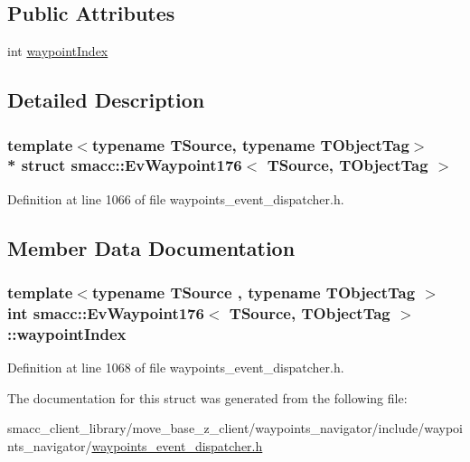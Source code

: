 \subsection*{Public Attributes}
\begin{DoxyCompactItemize}
\item 
int \hyperlink{structsmacc_1_1EvWaypoint176_aa2304f78eee05ed00c7d92f5c6ee546a}{waypoint\+Index}
\end{DoxyCompactItemize}


\subsection{Detailed Description}
\subsubsection*{template$<$typename T\+Source, typename T\+Object\+Tag$>$\\*
struct smacc\+::\+Ev\+Waypoint176$<$ T\+Source, T\+Object\+Tag $>$}



Definition at line 1066 of file waypoints\+\_\+event\+\_\+dispatcher.\+h.



\subsection{Member Data Documentation}
\subsubsection[{\texorpdfstring{waypoint\+Index}{waypointIndex}}]{\setlength{\rightskip}{0pt plus 5cm}template$<$typename T\+Source , typename T\+Object\+Tag $>$ int {\bf smacc\+::\+Ev\+Waypoint176}$<$ T\+Source, T\+Object\+Tag $>$\+::waypoint\+Index}\hypertarget{structsmacc_1_1EvWaypoint176_aa2304f78eee05ed00c7d92f5c6ee546a}{}\label{structsmacc_1_1EvWaypoint176_aa2304f78eee05ed00c7d92f5c6ee546a}


Definition at line 1068 of file waypoints\+\_\+event\+\_\+dispatcher.\+h.



The documentation for this struct was generated from the following file\+:\begin{DoxyCompactItemize}
\item 
smacc\+\_\+client\+\_\+library/move\+\_\+base\+\_\+z\+\_\+client/waypoints\+\_\+navigator/include/waypoints\+\_\+navigator/\hyperlink{waypoints__event__dispatcher_8h}{waypoints\+\_\+event\+\_\+dispatcher.\+h}\end{DoxyCompactItemize}
